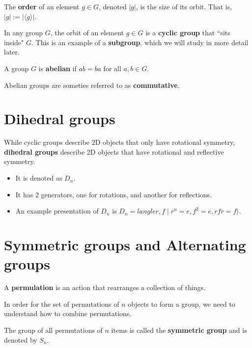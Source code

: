 \documentclass[twocolumn]{article}
\begin{document}
\begin{tcolorbox}[colback=blue!5!white,colframe=blue!15!white,coltitle=black, boxrule=0pt,title=Definition, drop shadow southeast, enhanced]
    The \textbf{order} of an element $g \in G$, denoted $|g|$, is the size of its orbit. That is, $|g|:=|\langle g \rangle|$.
\end{tcolorbox}

\begin{tcolorbox}[colback=blue!5!white,colframe=blue!15!white,coltitle=black, boxrule=0pt,title=Remark, drop shadow southeast, enhanced]
    In any group $G$, the orbit of an element $g \in G$ is a \textbf{cyclic group} that ``sits inside" $G$. This is an example of a \textbf{subgroup}, which we will study in more detail later.
\end{tcolorbox}

\begin{tcolorbox}[colback=blue!5!white,colframe=blue!15!white,coltitle=black, boxrule=0pt,title=Definition, drop shadow southeast, enhanced]
    A group $G$ is \textbf{abelian} if $ab = ba$ for all $a,b \in G$.
\end{tcolorbox}
Abelian groups are someties referred to as \textbf{commutative}.

\section{Dihedral groups}

While cyclic groups describe 2D objects that only have rotational symmetry, \textbf{dihedral groups} describe 2D objects that have rotational and reflective symmetry. 

\begin{itemize}
    \item It is denoted as $D_n$.
    \item It has 2 generators, one for rotations, and another for reflections.
    \item An example presentation of $D_n$ is $D_n =langle r,f \mid r^n = e, f^2 = e, rfr = f \rangle$.
\end{itemize}
 
\section{Symmetric groups and Alternating groups}

\begin{tcolorbox}[colback=blue!5!white,colframe=blue!15!white,coltitle=black, boxrule=0pt,title=Definition, drop shadow southeast, enhanced]
    A \textbf{permulation} is an action that rearranges a collection of things.
\end{tcolorbox}

In order for the set of permutations of $n$ objects to form a group, we need to understand how to combine permutations.

\begin{tcolorbox}[colback=blue!5!white,colframe=blue!15!white,coltitle=black, boxrule=0pt,title=Definition, drop shadow southeast, enhanced]
    The group of all permutations of $n$ items is called the \textbf{symmetric group} and is denoted by $S_n$.
\end{tcolorbox}
\end{document}

